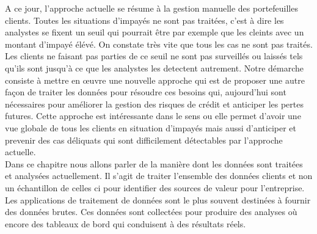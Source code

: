 \documentclass[11pt,a4paper]{report}
\begin{document}
A ce jour, l'approche actuelle se résume à la gestion manuelle des portefeuilles clients. Toutes les situations d'impayés ne sont pas traitées, c'est à dire les analystes se fixent un seuil qui pourrait être par exemple que les cleints avec un montant d'impayé élévé. On constate très vite que tous les cas ne sont pas traités. Les clients ne faisant pas parties de ce seuil ne sont pas surveillés ou laissés tels qu'ils sont jusqu'à ce que les analystes les detectent autrement. Notre démarche consiste à mettre en œuvre une nouvelle approche qui est de proposer une autre façon de traiter les données pour résoudre ces besoins qui, aujourd'hui sont nécessaires pour améliorer la gestion des risques de crédit et anticiper les pertes futures. Cette approche est intéressante dans le sens ou elle permet d'avoir une vue globale de tous les clients en situation d'impayés mais aussi d'anticiper et prevenir des cas déliquats qui sont difficilement détectables par l'approche actuelle. \\
%
%
%
%
%

Dans ce chapitre nous allons parler de la manière dont les données sont traitées et analysées actuellement. Il s'agit de traiter l'ensemble des données clients 
%
%
%
et non un échantillon de celles ci pour identifier des sources de valeur pour l'entreprise. Les applications de traitement de données sont le plus souvent destinées à fournir des données brutes. Ces données sont collectées pour produire des analyses où encore des tableaux de bord qui conduisent à des résultats réels. \newline
  
\end{document}

